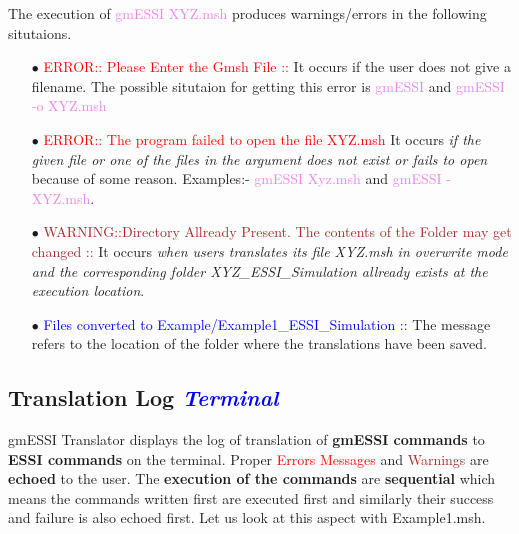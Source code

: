 \documentclass[11pt]{article}
\begin{document}
      The execution of \textcolor{violet}{gmESSI XYZ.msh} produces warnings/errors in the following situtaions. 

    \begin{itemize}

      \item[$\bullet$] \textcolor{red}{ERROR:: Please Enter the Gmsh File ::}
        It occurs if the user does not give a filename. The possible situtaion
        for getting this error is \textcolor{violet}{gmESSI} and
        \textcolor{violet}{gmESSI -o XYZ.msh}

      \item[$\bullet$] \textcolor{red}{ERROR:: The program failed to open the
        file XYZ.msh } It occurs \textit{if the given file or one of the files
        in the argument does not exist or fails to open} because of some
        reason. Examples:- \textcolor{violet}{gmESSI Xyz.msh} and
        \textcolor{violet}{gmESSI - XYZ.msh}.

      \item[$\bullet$] \textcolor{brown}{WARNING::Directory Allready Present.
        The contents of the Folder may get changed ::} It occurs \textit{when
        users translates its file XYZ.msh in overwrite mode and the
        corresponding folder XYZ\_ESSI\_Simulation allready exists at the
        execution location}.

      \item[$\bullet$] \textcolor{blue}{Files converted to
        Example/Example1\_ESSI\_Simulation :: } The message refers to the
        location of the folder where the translations have been saved.

    \end{itemize}

\subsection{Translation Log \textcolor{blue}{\textit{Terminal}}}


gmESSI Translator displays the log of translation of \textbf{gmESSI
commands} to \textbf{ESSI commands} on the terminal. Proper
\textcolor{red}{Errors Messages} and \textcolor{brown}{Warnings} are
\textbf{echoed} to the user. The \textbf{execution of the commands} are
\textbf{sequential} which means the commands written first are executed
first and similarly their success and failure is also echoed first. Let us
look at this aspect with Example1.msh.
\end{document}
